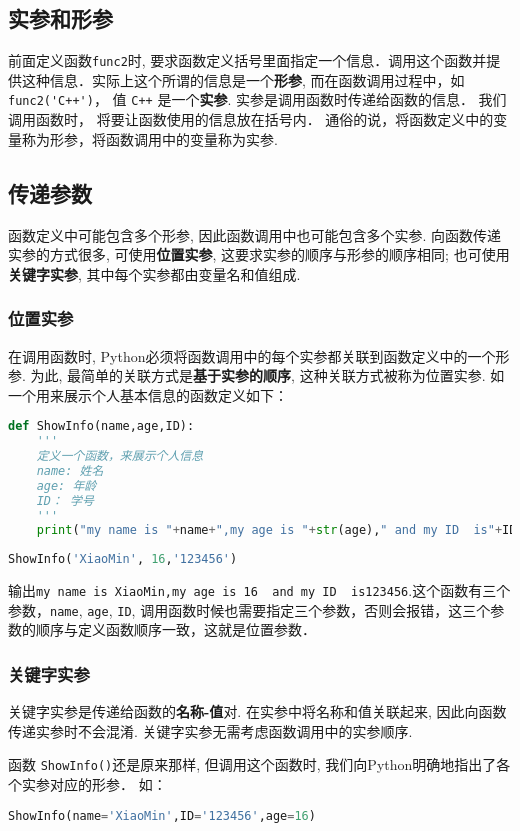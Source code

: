 \subsection{实参和形参}
前面定义函数\verb|func2|时, 要求函数定义括号里面指定一个信息．调用这个函数并提供这种信息．实际上这个所谓的信息是一个\textbf{形参}, 而在函数调用过程中，如\verb|func2('C++')|， 值 \verb|C++| 是一个\textbf{实参}. 实参是调用函数时传递给函数的信息． 我们调用函数时， 将要让函数使用的信息放在括号内． 通俗的说，将函数定义中的变量称为形参，将函数调用中的变量称为实参.

\subsection{传递参数}
函数定义中可能包含多个形参, 因此函数调用中也可能包含多个实参. 向函数传递实参的方式很多, 可使用\textbf{位置实参}, 这要求实参的顺序与形参的顺序相同; 也可使用\textbf{关键字实参}, 其中每个实参都由变量名和值组成.
\subsubsection{位置实参}
在调用函数时, Python必须将函数调用中的每个实参都关联到函数定义中的一个形参. 为此, 最简单的关联方式是\textbf{基于实参的顺序}, 这种关联方式被称为位置实参. 如
一个用来展示个人基本信息的函数定义如下：
\begin{lstlisting}[language=python]
def ShowInfo(name,age,ID):
    '''
    定义一个函数，来展示个人信息
    name: 姓名
    age: 年龄
    ID： 学号
    '''
    print("my name is "+name+",my age is "+str(age)," and my ID  is"+ID)
\end{lstlisting}
\begin{lstlisting}[language=python]
ShowInfo('XiaoMin', 16,'123456')
\end{lstlisting}
输出\verb|my name is XiaoMin,my age is 16  and my ID  is123456|.这个函数有三个参数，\verb|name|, \verb|age|, \verb|ID|, 调用函数时候也需要指定三个参数，否则会报错，这三个参数的顺序与定义函数顺序一致，这就是位置参数．
\subsubsection{关键字实参}
关键字实参是传递给函数的\textbf{名称-值}对. 在实参中将名称和值关联起来, 因此向函数传递实参时不会混淆. 关键字实参无需考虑函数调用中的实参顺序.

函数 \verb|ShowInfo()|还是原来那样, 但调用这个函数时, 我们向Python明确地指出了各个实参对应的形参． 如：
\begin{lstlisting}[language=python]
ShowInfo(name='XiaoMin',ID='123456',age=16)
\end{lstlisting}
